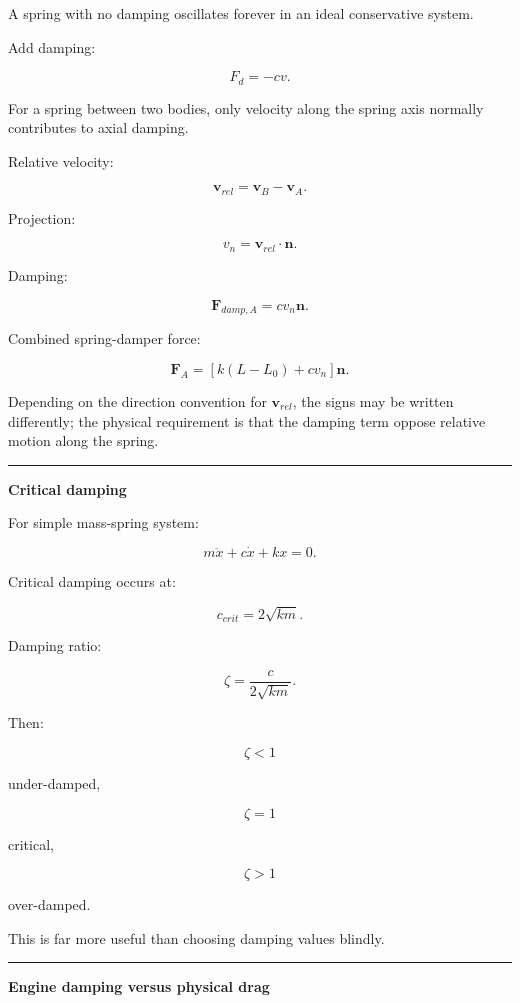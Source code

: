 A spring with no damping oscillates forever in an ideal conservative system.

Add damping:

\[
\boxed{
F_d=-cv.
}
\]

For a spring between two bodies, only velocity along the spring axis normally contributes to axial damping.

Relative velocity:

\[
\mathbf{v}_{rel}
=
\mathbf{v}_B-\mathbf{v}_A.
\]

Projection:

\[
v_n
=
\mathbf{v}_{rel}\cdot\mathbf{n}.
\]

Damping:

\[
\mathbf{F}_{damp,A}
=
c v_n\mathbf{n}.
\]

Combined spring-damper force:

\[
\boxed{
\mathbf{F}_A
=
\left[
k(L-L_0)
+
cv_n
\right]\mathbf{n}.
}
\]

Depending on the direction convention for \(\mathbf{v}_{rel}\), the signs may be written differently; the physical requirement is that the damping term oppose relative motion along the spring.

\begin{center}\rule{0.5\linewidth}{0.5pt}\end{center}

\textbf{Critical damping}

For simple mass-spring system:

\[
m\ddot x+
c\dot x+
kx=0.
\]

Critical damping occurs at:

\[
\boxed{
c_{crit}
=
2\sqrt{km}.
}
\]

Damping ratio:

\[
\zeta
=
\frac{c}
{2\sqrt{km}}.
\]

Then:

\[
\zeta<1
\]

under-damped,

\[
\zeta=1
\]

critical,

\[
\zeta>1
\]

over-damped.

This is far more useful than choosing damping values blindly.

\begin{center}\rule{0.5\linewidth}{0.5pt}\end{center}

\textbf{Engine damping versus physical drag}

